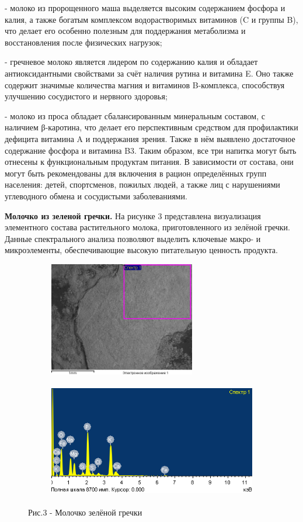 \begin{multicols}{2}
- молоко из пророщенного маша выделяется высоким содержанием фосфора и
калия,
а также богатым комплексом водорастворимых витаминов (C и группы B), что
делает его особенно полезным для поддержания метаболизма и
восстановления после физических нагрузок;

- гречневое молоко является лидером по содержанию калия и обладает
антиоксидантными свойствами за счёт наличия рутина и витамина E. Оно
также содержит значимые количества магния и витаминов B-комплекса,
способствуя улучшению сосудистого и нервного здоровья;

- молоко из проса обладает сбалансированным минеральным составом, с
наличием β-каротина, что делает его перспективным средством для
профилактики дефицита витамина A и поддержания зрения. Также в нём
выявлено достаточное содержание фосфора и витамина B3.
Таким образом, все три напитка могут быть отнесены к функциональным
продуктам питания. В зависимости от состава, они могут быть
рекомендованы для включения в рацион определённых групп населения:
детей, спортсменов, пожилых людей, а также лиц с нарушениями углеводного
обмена и сосудистыми заболеваниями.

{\bfseries Молочко из зеленой гречки.} На рисунке 3 представлена
визуализация элементного состава растительного молока, приготовленного
из зелёной гречки. Данные спектрального анализа позволяют выделить
ключевые макро- и микроэлементы, обеспечивающие высокую питательную
ценность продукта.
\end{multicols}

\begin{figure}[H]
	\centering
	\begin{subfigure}{0.4\textwidth}
		\centering
		\includegraphics[height=5cm]{media/pish/image49}
	\end{subfigure}
	\hfill
	\begin{subfigure}{0.55\textwidth}
		\centering
		\includegraphics[height=5cm]{media/pish/image50}
	\end{subfigure}
    \caption*{Рис.3 - Молочко зелёной гречки}
\end{figure}


